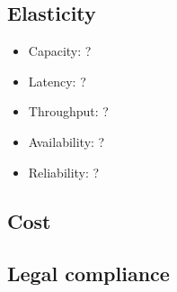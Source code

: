 \subsection{Elasticity}
	\begin{itemize}
		\item Capacity: ?
		\item Latency: ?
		\item Throughput: ? 
		\item Availability: ?
		\item Reliability: ?
	\end{itemize}
\subsection{Cost}
\subsection{Legal compliance}
